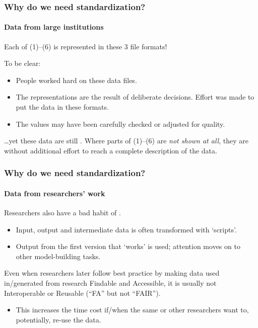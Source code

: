 \documentclass[12pt,aspectratio=169]{beamer}
\begin{document}
\begin{frame}
\frametitle{Why do we need standardization?}
\framesubtitle{Data from large institutions}

Each of (1)–(6) is represented  in these 3 file formats!

\bigskip
To be clear:
\begin{itemize}
  \item People worked hard on these data files.
  \item The representations are the result of deliberate decisions.
  Effort was made to put the data in these formats.
  \item The values may have been carefully checked or adjusted for quality.
\end{itemize}

\bigskip
…yet these data are still .
Where parts of (1)–(6) are \emph{not shown at all}, they are  without additional effort to reach a complete description of the data.
\end{frame}

\begin{frame}
\frametitle{Why do we need standardization?}
\framesubtitle{Data from researchers' work}

Researchers also have a bad habit of .
\begin{itemize}
  \item Input, output and intermediate data is often transformed with ‘scripts’.
  \item Output from the first version that ‘works’ is used; attention moves on to other model-building tasks.
\end{itemize}

\medskip
Even when researchers later follow best practice by making data used in/generated from research Findable and Accessible, it is usually not Interoperable or Reusable (“FA” but not “FAIR”).
\begin{itemize}
  \item This increases the time cost if/when the same or other researchers want to, potentially, re-use the data.
\end{itemize}

\end{frame}
\end{document}

